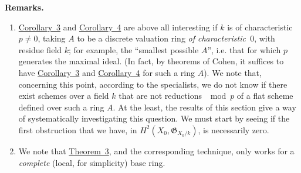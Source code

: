 \documentclass{article}
\newenvironment{rmenv}[1]
  {\phantomsection\par\medskip\noindent\textbf{#1.}\rmfamily}
  {\medskip}
\newcommand{\fk}{\mathfrak}
\newcommand{\oldpage}[1]{\marginpar{\footnotesize$\Big\vert$ \textit{p.~#1}}}
\begin{document}
\begin{rmenv}{Remarks}
  \begin{enumerate}[1)]
    \item \hyperref[theorem9corollary3]{Corollary~3} and \hyperref[theorem9corollary4]{Corollary~4} are above all interesting if $k$ is of characteristic~$p\neq0$, taking $A$ to be a discrete valuation ring \emph{of characteristic~$0$}, with residue field $k$;
      for example, the ``smallest possible $A$'', i.e. that for which $p$ generates the maximal ideal.
      (In fact, by theorems of Cohen, it suffices to have \hyperref[theorem9corollary3]{Corollary~3} and \hyperref[theorem9corollary4]{Corollary~4} for such a ring $A$).
      We note that, concerning this point, according to the specialists, we do not know if there exist schemes over a field $k$ that are not reductions $\mod p$ of a flat scheme defined over such a ring $A$.
      At the least, the results of this section give a way of systematically investigating this question.
      We must start
\oldpage{182-15}
      by seeing if the first obstruction that we have, in $H^2(X_0,\fk{G}_{X_0/k})$, is necessarily zero.
    \item We note that \hyperref[theorem3]{Theorem~3}, and the corresponding technique, only works for a \emph{complete} (local, for simplicity) base ring.


\end{enumerate}
\end{rmenv}
\end{document}
